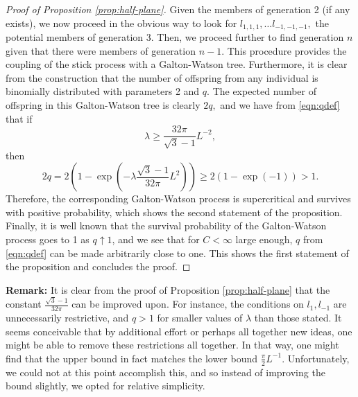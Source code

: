 \documentclass[a4paper,12pt]{article}
\begin{document}
\begin{proof}[Proof of Proposition \ref{prop:half-plane}]
Given the members of generation 2 (if any exists), we now proceed in the obvious way to look for 
$l_{1,1,1},\ldots l_{-1,-1,-1},$ the potential members of generation 3. Then, we proceed 
further to find generation $n$ given that there were members of generation $n-1.$ This 
procedure provides the coupling of the stick process with a Galton-Watson tree. 
Furthermore, it is clear from the construction that the number of offspring 
from any individual is 
binomially distributed with parameters 2 and $q.$ 
The expected number of offspring in this 
Galton-Watson tree is clearly $2q,$ and we have from \eqref{eqn:qdef} that if 
\[
\lambda \geq \frac{32 \pi}{\sqrt{3}-1}L^{-2},
\]
then
\[
2q = 2\left(1-\exp\left(-\lambda \frac{\sqrt{3}-1}{32 \pi}L^2\right)\right)
\geq 2\left(1-\exp\left(-1\right)\right)>1.
\]
Therefore, the corresponding Galton-Watson process is supercritical and survives 
with positive probability, which shows the second statement of the proposition.
Finally, it is well known that the survival probability of the 
Galton-Watson process
goes to 1 as $q \uparrow  1$, and we see that for $C<\infty$ large enough, 
$q$ from \eqref{eqn:qdef} can be made arbitrarily close to one. This shows the 
first statement of the proposition and concludes the proof.
\end{proof}
\noindent
{\bf Remark:} It is clear from the proof of Proposition \ref{prop:half-plane} that 
the constant $\frac{\sqrt{3}-1}{32 \pi}$ can be improved upon. For instance, the conditions 
on $l_1,l_{-1}$ are unnecessarily restrictive, and $q>1$ for smaller values of $\lambda$
than those stated. It seems conceivable that by additional effort or perhaps all together 
new ideas, one might be able to remove these restrictions all together. In that way, one 
might find that the upper bound in fact matches the lower bound 
$\frac{\pi}{2}L^{-1}$. Unfortunately, we could 
not at this point accomplish this, and so instead of improving the bound slightly, we opted 
for relative simplicity.



\medskip
\end{document}
